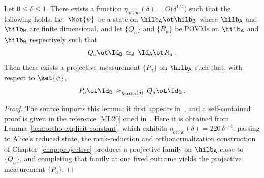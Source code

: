 \begin{lemma}
	\label{lem:ortho}
	\leanok
	Let $0 \leq \delta \leq 1$. There exists a function
	$\eta_{\mathrm{ortho}}(\delta) = O\big(\delta^{1/4}\big)$ such that the
	following holds. Let $\ket{\psi}$ be a state on
	$\hilb_{\mathsf{A}} \ot \hilb_{\mathsf{B}}$ where $\hilb_{\mathsf{A}}$
	and $\hilb_{\mathsf{B}}$ are finite dimensional, and let $\{Q_a\}$ and
	$\{R_a\}$ be POVMs on $\hilb_{\mathsf{A}}$ and $\hilb_{\mathsf{B}}$
	respectively such that
	\begin{equation}\label{eq:cons-cond}
		Q_a \ot \Id_{\mathsf{B}} \,\simeq_\delta\, \Id_{\mathsf{A}} \ot R_a\,.
	\end{equation}
	Then there exists a projective measurement $\{P_a\}$ on
	$\hilb_{\mathsf{A}}$ such that, with respect to $\ket{\psi}$,
	\begin{equation}\label{eq:cons-ccl}
		P_a \ot \Id_{\mathsf{B}} \,\approx_{\eta_{\mathrm{ortho}}(\delta)}\, Q_a \ot \Id_{\mathsf{B}}\,.
	\end{equation}
\end{lemma}
\begin{proof}
	\leanok
	The source imports this lemma: it first appears in~\cite{KV11}, and a
	self-contained proof is given in the reference [ML20] cited
	in~\cite{Ji2020MIPStar}. Here it is obtained from
	Lemma~\ref{lem:ortho-explicit-constant}, which exhibits
	$\eta_{\mathrm{ortho}}(\delta) = 220\,\delta^{1/4}$: passing to Alice's
	reduced state, the rank-reduction and orthonormalization construction of
	Chapter~\ref{chap:projective} produces a projective family on
	$\hilb_{\mathsf{A}}$ close to $\{Q_a\}$, and completing that family at one
	fixed outcome yields the projective measurement $\{P_a\}$.
\end{proof}

